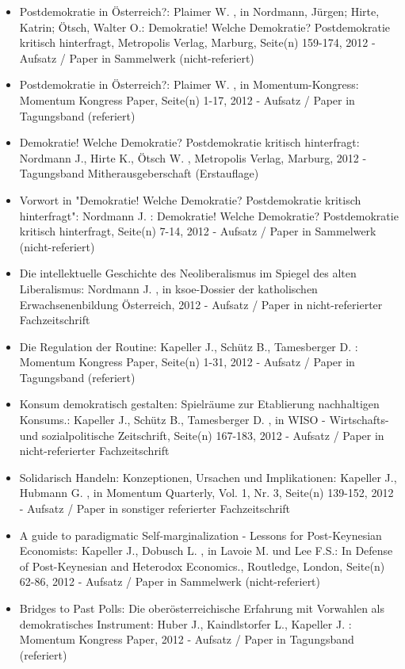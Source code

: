 \begin{itemize}
	 \item Postdemokratie in Österreich?: Plaimer W. , in Nordmann, Jürgen; Hirte, Katrin; Ötsch, Walter O.: Demokratie! Welche Demokratie? Postdemokratie kritisch hinterfragt, Metropolis Verlag, Marburg, Seite(n) 159-174, 2012 - Aufsatz / Paper in Sammelwerk (nicht-referiert)
	 \item Postdemokratie in Österreich?: Plaimer W. , in Momentum-Kongress: Momentum Kongress Paper, Seite(n) 1-17, 2012 - Aufsatz / Paper in Tagungsband (referiert)
	 \item Demokratie! Welche Demokratie? Postdemokratie kritisch hinterfragt: Nordmann J., Hirte K., Ötsch W. , Metropolis Verlag, Marburg, 2012 - Tagungsband Mitherausgeberschaft (Erstauflage)
	 \item Vorwort in "Demokratie! Welche Demokratie? Postdemokratie kritisch hinterfragt": Nordmann J. : Demokratie! Welche Demokratie? Postdemokratie kritisch hinterfragt, Seite(n) 7-14, 2012 - Aufsatz / Paper in Sammelwerk (nicht-referiert)
	 \item Die intellektuelle Geschichte des Neoliberalismus im Spiegel des alten Liberalismus: Nordmann J. , in ksoe-Dossier der katholischen Erwachsenenbildung Österreich, 2012 - Aufsatz / Paper in nicht-referierter Fachzeitschrift
	 \item Die Regulation der Routine: Kapeller J., Schütz B., Tamesberger D. : Momentum Kongress Paper, Seite(n) 1-31, 2012 - Aufsatz / Paper in Tagungsband (referiert)
	 \item Konsum demokratisch gestalten: Spielräume zur Etablierung nachhaltigen Konsums.: Kapeller J., Schütz B., Tamesberger D. , in WISO - Wirtschafts- und sozialpolitische Zeitschrift, Seite(n) 167-183, 2012 - Aufsatz / Paper in nicht-referierter Fachzeitschrift
	 \item Solidarisch Handeln: Konzeptionen, Ursachen und Implikationen: Kapeller J., Hubmann G. , in Momentum Quarterly, Vol. 1, Nr. 3, Seite(n) 139-152, 2012 - Aufsatz / Paper in sonstiger referierter Fachzeitschrift
	 \item A guide to paradigmatic Self-marginalization - Lessons for Post-Keynesian Economists: Kapeller J., Dobusch L. , in Lavoie M. und Lee F.S.: In Defense of Post-Keynesian and Heterodox Economics., Routledge, London, Seite(n) 62-86, 2012 - Aufsatz / Paper in Sammelwerk (nicht-referiert)
	 \item Bridges to Past Polls: Die oberösterreichische Erfahrung mit Vorwahlen als demokratisches Instrument: Huber J., Kaindlstorfer L., Kapeller J. : Momentum Kongress Paper, 2012 - Aufsatz / Paper in Tagungsband (referiert)

\end{itemize}
